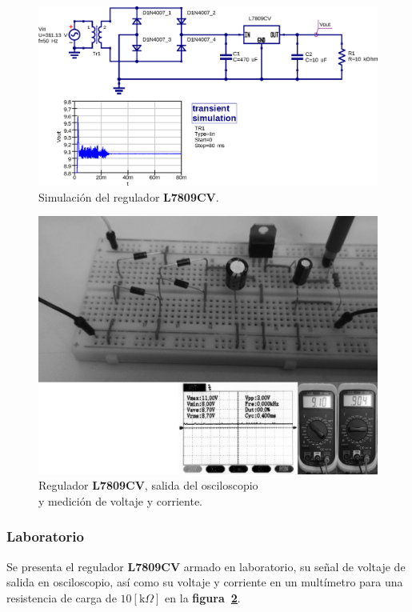 \begin{figure}[!h]
\centering
\includegraphics[scale=0.75]{simulacion/09.regulador1.eps}
\caption{Simulación del regulador \textbf{L7809CV}.}
\label{simulacion09}
\end{figure}

\begin{figure}[!h]
\centering
\includegraphics[scale=0.26]{fotos/09.regulador1.eps}
\caption{Regulador \textbf{L7809CV}, salida del osciloscopio\\
y medición de voltaje y corriente.}
\label{laboratorio11}
\end{figure}

\subsubsection{Laboratorio}
Se presenta el regulador \textbf{L7809CV} armado en laboratorio, su señal de
voltaje de salida en osciloscopio, así como su voltaje y corriente en un
multímetro para una resistencia de carga de $10[\text{k}\Omega]$ en la
\textbf{figura~\ref{laboratorio11}}.

